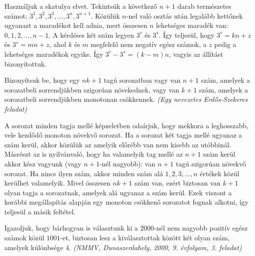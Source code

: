 \begin{solution}
	Használjuk a skatulya elvet. Tekintsük a következő $n+1$ darab természetes
	számot: $3^{1},3^{2},3^{3},\dots,3^{n},3^{n+1}$. Közülük $n$-nel
	való osztás után legalább kettőnek ugyanazt a maradékot kell adnia,
	mert összesen $n$ lehetséges maradék van: $0,1,2,\dots,n-1$. A kérdéses
	két szám legyen $3^{r}$ és $3^{s}$. Így teljesül, hogy $3^{r}=kn+z$
	és $3^{s}=mn+z$, ahol $k$ és $m$ megfelelő nem negatív egész számok,
	a $z$ pedig a lehetséges maradékok egyike. Így $3^{r}-3^{s}=(k-m)n$,
	vagyis az állítást bizonyítottuk. 
\end{solution}
\begin{extraproblem}
	Bizonyítsuk be, hogy egy $nk+1$ tagú sorozatban vagy van $n+1$
	szám, amelyek a sorozatbeli sorrendjükben szigorúan növekednek, vagy
	van $k+1$ szám, amelyek a sorozatbeli sorrendjükben monotonan csökkennek.
	\emph{(Egy nevezetes Erdős-Szekeres feladat) }
\end{extraproblem}

\begin{solution}
	A sorozat minden tagja mellé képzeletben odaírjuk, hogy mekkora a
	leghosszabb, vele kezdődő monoton növekvő sorozat. Ha a sorozat két
	tagja mellé ugyanaz a szám kerül, akkor közülük az amelyik előrébb
	van nem kisebb az utóbbinál. Másrészt az is nyilvánvaló, hogy ha valamelyik
	tag mellé az $n+1$ szám kerül akkor kész vagyunk (vagy $n+1$-nél
	nagyobb): van $n+1$ tagú szigorúan növekvő sorozat. Ha nincs ilyen
	szám, akkor minden szám alá $1,2,3,...,n$ értékek közül kerülhet
	valamelyik. Mivel összesen $nk+1$ szám van, ezért biztosan van $k+1$
	olyan tagja a sorozatnak, amelyek alá ugyanaz a szám kerül. Ezek viszont
	a korábbi megállapítás alapján egy monoton csökkenő sorozatot fognak
	alkotni, így teljesül a másik feltétel. 
\end{solution}
\begin{extraproblem}
	Igazoljuk, hogy bárhogyan is választunk ki a $2000$-nél nem nagyobb
	pozitív egész számok közül $1001$-et, biztosan lesz a kiválasztottak
	között két olyan szám, amelyek különbsége $4$. \textit{(NMMV, Dunaszerdahely,
		2000, 9. évfolyam, 3. feladat)} 
\end{extraproblem}

